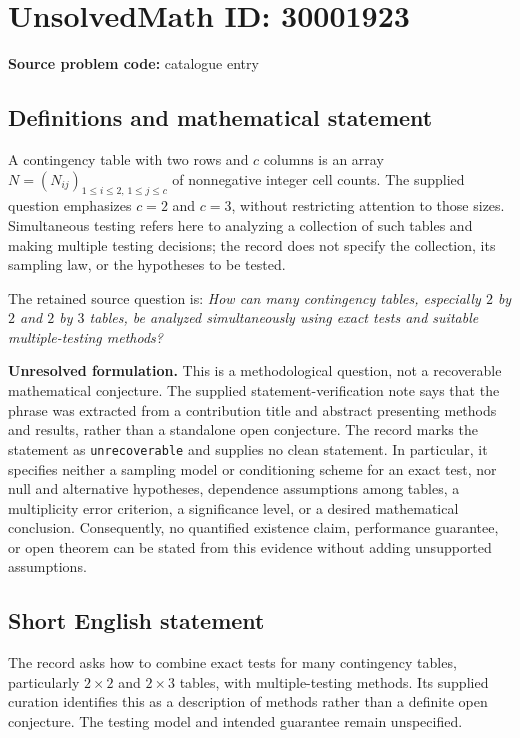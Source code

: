 \documentclass[11pt]{article}
\begin{document}
\section*{UnsolvedMath ID: 30001923}
\textbf{Source problem code:} catalogue entry
\subsection{Definitions and mathematical statement}
A contingency table with two rows and \(c\) columns is an array \(N=(N_{ij})_{1\leq i\leq 2,\,1\leq j\leq c}\) of nonnegative integer cell counts. The supplied question emphasizes \(c=2\) and \(c=3\), without restricting attention to those sizes. Simultaneous testing refers here to analyzing a collection of such tables and making multiple testing decisions; the record does not specify the collection, its sampling law, or the hypotheses to be tested.

The retained source question is: \emph{How can many contingency tables, especially \(2\) by \(2\) and \(2\) by \(3\) tables, be analyzed simultaneously using exact tests and suitable multiple-testing methods?}

\textbf{Unresolved formulation.} This is a methodological question, not a recoverable mathematical conjecture. The supplied statement-verification note says that the phrase was extracted from a contribution title and abstract presenting methods and results, rather than a standalone open conjecture. The record marks the statement as \texttt{unrecoverable} and supplies no clean statement. In particular, it specifies neither a sampling model or conditioning scheme for an exact test, nor null and alternative hypotheses, dependence assumptions among tables, a multiplicity error criterion, a significance level, or a desired mathematical conclusion. Consequently, no quantified existence claim, performance guarantee, or open theorem can be stated from this evidence without adding unsupported assumptions.
\subsection{Short English statement}
The record asks how to combine exact tests for many contingency tables, particularly \(2\times2\) and \(2\times3\) tables, with multiple-testing methods. Its supplied curation identifies this as a description of methods rather than a definite open conjecture. The testing model and intended guarantee remain unspecified.
\end{document}
